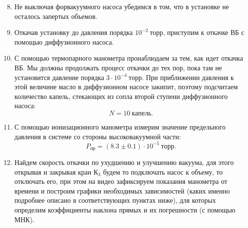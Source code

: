 \documentclass[a4paper,12pt]{article}
\theoremstyle{definition}
\begin{document}
	\begin{enumerate}
		\setcounter{enumi}{7}
		
		\item Не выключая форвакуумного насоса убедимся в том, что в установке не осталось запертых объемов. 
		
		\item Откачав установку до давления порядка $ 10^{-2}~торр$, приступим к откачке ВБ с помощью диффузионного насоса. 
		
		
		\item С помощью термопарного манометра пронаблюдаем за тем, как идет откачка ВБ. Мы должны продолжать процесс откачки до тех пор, пока там не установится давление порядка $3 \cdot 10^{-4}~торр.$ При приближении давления к этой величине масло в диффузионном насосе закипит, поэтому подсчитаем количество капель, стекающих из сопла второй ступени диффузионного насоса: $$ N = 10 ~ капель.$$
		
		\item С помощью ионизационного манометра измерим значение предельного давления в системе со стороны высоковакуумной части: $$P_{пр} = (8.3 \pm 0.1)  \cdot 10^{-5} ~торр.$$
		
		
		\item Найдем скорость откачки по ухудшению и улучшению вакуума, для этого открывая и закрывая кран $К_3$ будем то подключать насос к объему, то отключать его, при этом на видео зафиксируем показания манометра от времени и построим графики необходимых  зависимостей (каких именно подробнее описано в соответствующих пунктах ниже), для которых определим коэффициенты наклона прямых и их погрешности (с помощью МНК).
		

\end{enumerate}
\end{document}
